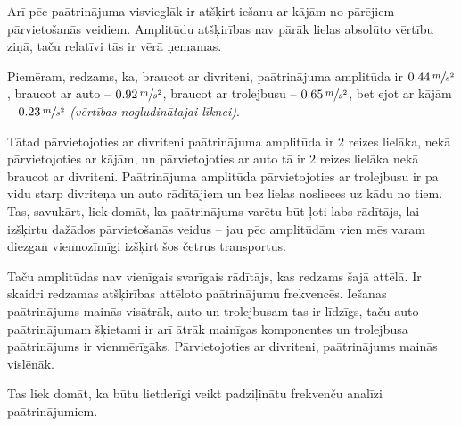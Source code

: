 \documentclass{ludis}
\begin{document}
Arī pēc paātrinājuma visvieglāk ir atšķirt iešanu ar kājām no pārējiem pārvietošanās veidiem. 
Amplitūdu atšķirības nav pārāk lielas absolūto vērtību ziņā, taču relatīvi tās ir vērā ņemamas.

Piemēram, redzams, ka, braucot ar divriteni, paātrinājuma amplitūda ir $0.44\,\sfrac{m}{s^2}$,
braucot ar auto -- $0.92\,\sfrac{m}{s^2}$, braucot ar trolejbusu -- $0.65\,\sfrac{m}{s^2}$, 
bet ejot ar kājām -- $0.23\,\sfrac{m}{s^2}$ \emph{(vērtības nogludinātajai līknei)}. 

Tātad pārvietojoties ar divriteni paātrinājuma amplitūda ir $2$ reizes
lielāka, nekā pārvietojoties ar kājām, un pārvietojoties ar auto tā ir $2$ reizes lielāka nekā
braucot ar divriteni. Paātrinājuma amplitūda pārvietojoties ar trolejbusu ir pa vidu starp
divriteņa un auto rādītājiem un bez lielas noslieces uz kādu no tiem. Tas, savukārt, liek domāt,
ka paātrinājums varētu būt ļoti labs rādītājs, lai izšķirtu dažādos pārvietošanās veidus -- jau
pēc amplitūdām vien mēs varam diezgan viennozīmīgi izšķirt šos četrus transportus.

Taču amplitūdas nav vienīgais svarīgais rādītājs, kas redzams šajā attēlā. Ir skaidri redzamas
atšķirības attēloto paātrinājumu frekvencēs. Iešanas paātrinājums mainās visātrāk, auto
un trolejbusam tas ir līdzīgs, taču auto paātrinājumam šķietami ir arī ātrāk mainīgas komponentes
un trolejbusa paātrinājums ir vienmērīgāks. Pārvietojoties ar divriteni, paātrinājums mainās
vislēnāk.

Tas liek domāt, ka būtu lietderīgi veikt padziļinātu frekvenču analīzi paātrinājumiem.

\end{document}
